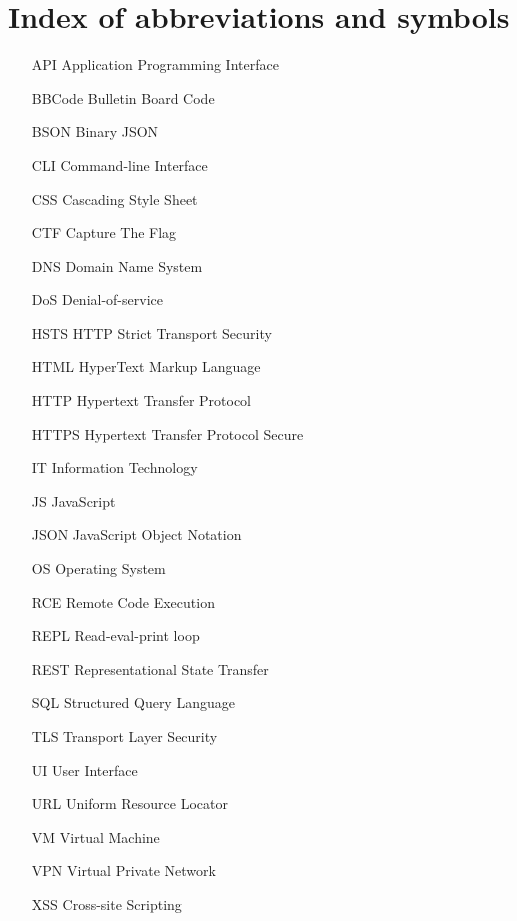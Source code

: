 \chapter{Index of abbreviations and symbols}

\begin{itemize}
	\item[API] Application Programming Interface
	\item[BBCode] Bulletin Board Code
	\item[BSON] Binary JSON
	\item[CLI] Command-line Interface
	\item[CSS] Cascading Style Sheet
	\item[CTF] Capture The Flag
	\item[DNS] Domain Name System
	\item[DoS] Denial-of-service
	\item[HSTS] HTTP Strict Transport Security
	\item[HTML] HyperText Markup Language
	\item[HTTP] Hypertext Transfer Protocol
	\item[HTTPS] Hypertext Transfer Protocol Secure
	\item[IT] Information Technology
	\item[JS] JavaScript
	\item[JSON] JavaScript Object Notation
	\item[OS] Operating System
	\item[RCE] Remote Code Execution
	\item[REPL] Read-eval-print loop
	\item[REST] Representational State Transfer
	\item[SQL] Structured Query Language
	\item[TLS] Transport Layer Security
	\item[UI] User Interface
	\item[URL] Uniform Resource Locator
	\item[VM] Virtual Machine
	\item[VPN] Virtual Private Network
	\item[XSS] Cross-site Scripting
\end{itemize}
